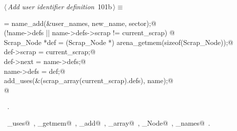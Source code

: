 \documentclass[a4paper]{report}
\begin{document}
\begin{flushleft} \small
\begin{minipage}{\linewidth}\label{scrap209}\raggedright\small
{} $\langle\,${\it Add user identifier definition}\nobreak\ {\footnotesize {101b}}$\,\rangle\equiv$
\vspace{-1ex}
\begin{list}{}{} \item
\mbox{}\verb@name = name_add(&user_names, new_name, sector);@\\
\mbox{}\verb@if (!name->defs || name->defs->scrap != current_scrap) {@\\
\mbox{}\verb@  Scrap_Node *def = (Scrap_Node *) arena_getmem(sizeof(Scrap_Node));@\\
\mbox{}\verb@  def->scrap = current_scrap;@\\
\mbox{}\verb@  def->next = name->defs;@\\
\mbox{}\verb@  name->defs = def;@\\
\mbox{}\verb@  add_uses(&(scrap_array(current_scrap).defs), name);@\\
\mbox{}\verb@}@{\NWsep}
\end{list}
\vspace{-1.5ex}
\footnotesize
\begin{list}{}{\setlength{\itemsep}{-\parsep}\setlength{\itemindent}{-\leftmargin}}
\item \NWtxtMacroRefIn\ .
\item \NWtxtIdentsUsed\nobreak\  \verb@add_uses@\nobreak\ , \verb@arena_getmem@\nobreak\ , \verb@name_add@\nobreak\ , \verb@scrap_array@\nobreak\ , \verb@Scrap_Node@\nobreak\ , \verb@user_names@\nobreak\ .
\item{}
\end{list}
\end{minipage}\vspace{4ex}
\end{flushleft}
\end{document}

